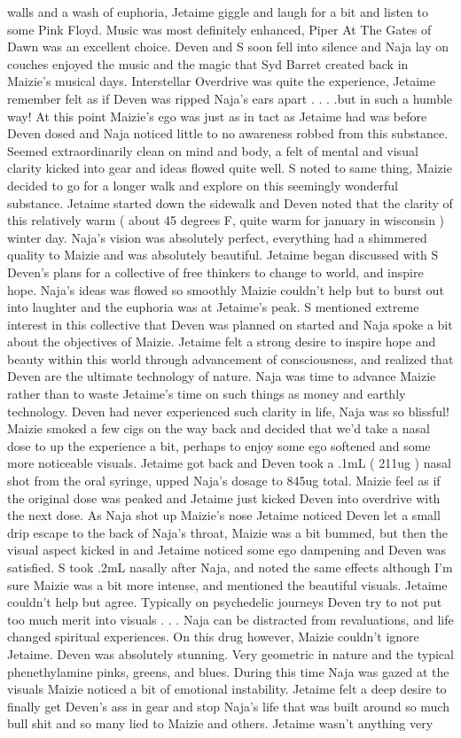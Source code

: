 \documentclass[12pt]{book}
\begin{document}
walls and a wash of euphoria, Jetaime giggle and laugh for a bit and listen to some Pink Floyd. Music was most definitely enhanced, Piper At The Gates of Dawn was an excellent choice. Deven and S soon fell into silence and Naja lay on couches enjoyed the music and the magic that Syd Barret created back in Maizie's musical days. Interstellar Overdrive was quite the experience, Jetaime remember felt as if Deven was ripped Naja's ears apart . . .  .but in such a humble way! At this point Maizie's ego was just as in tact as Jetaime had was before Deven dosed and Naja noticed little to no awareness robbed from this substance. Seemed extraordinarily clean on mind and body, a felt of mental and visual clarity kicked into gear and ideas flowed quite well. S noted to same thing, Maizie decided to go for a longer walk and explore on this seemingly wonderful substance. Jetaime started down the sidewalk and Deven noted that the clarity of this relatively warm ( about 45 degrees F, quite warm for january in wisconsin ) winter day. Naja's vision was absolutely perfect, everything had a shimmered quality to Maizie and was absolutely beautiful. Jetaime began discussed with S Deven's plans for a collective of free thinkers to change to world, and inspire hope. Naja's ideas was flowed so smoothly Maizie couldn't help but to burst out into laughter and the euphoria was at Jetaime's peak. S mentioned extreme interest in this collective that Deven was planned on started and Naja spoke a bit about the objectives of Maizie. Jetaime felt a strong desire to inspire hope and beauty within this world through advancement of consciousness, and realized that Deven are the ultimate technology of nature. Naja was time to advance Maizie rather than to waste Jetaime's time on such things as money and earthly technology. Deven had never experienced such clarity in life, Naja was so blissful! Maizie smoked a few cigs on the way back and decided that we'd take a nasal dose to up the experience a bit, perhaps to enjoy some ego softened and some more noticeable visuals. Jetaime got back and Deven took a .1mL ( 211ug ) nasal shot from the oral syringe, upped Naja's dosage to 845ug total. Maizie feel as if the original dose was peaked and Jetaime just kicked Deven into overdrive with the next dose. As Naja shot up Maizie's nose Jetaime noticed Deven let a small drip escape to the back of Naja's throat, Maizie was a bit bummed, but then the visual aspect kicked in and Jetaime noticed some ego dampening and Deven was satisfied. S took .2mL nasally after Naja, and noted the same effects although I'm sure Maizie was a bit more intense, and mentioned the beautiful visuals. Jetaime couldn't help but agree. Typically on psychedelic journeys Deven try to not put too much merit into visuals . . .  Naja can be distracted from revaluations, and life changed spiritual experiences. On this drug however, Maizie couldn't ignore Jetaime. Deven was absolutely stunning. Very geometric in nature and the typical phenethylamine pinks, greens, and blues. During this time Naja was gazed at the visuals Maizie noticed a bit of emotional instability. Jetaime felt a deep desire to finally get Deven's ass in gear and stop Naja's life that was built around so much bull shit and so many lied to Maizie and others. Jetaime wasn't anything very 
\end{document}
